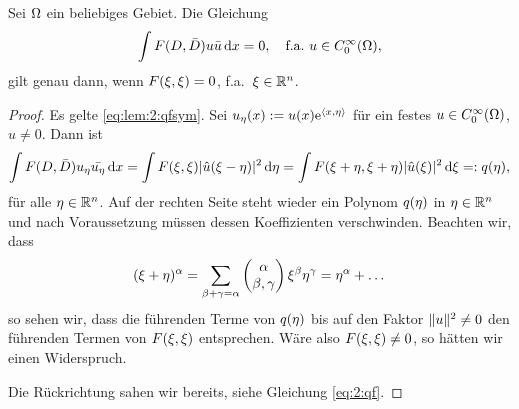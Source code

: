 \begin{lem}\label{lem:2:qfsym}
Sei $\Omega$ ein beliebiges Gebiet.
Die Gleichung
\begin{equation}\label{eq:lem:2:qfsym}
\int F(D,\bar{D})u\bar{u}\,\mathrm d x=0,
\quad\text{f.a.}~u\in C^\infty_0(\Omega),
\end{equation}
gilt genau dann, wenn $F(\xi,\xi)=0$, f.a.~$\xi\in\mathbb R^n$.
\end{lem}
\begin{proof}
Es gelte \eqref{eq:lem:2:qfsym}.
Sei $u_\eta(x):=u(x)\mathrm e^{\langle x,\eta\rangle}$ für ein festes $u\in C^\infty_0(\Omega)$, $u\neq0$.
Dann ist
\begin{equation}
\int F(D,\bar{D})u_\eta\bar{u_\eta}\,\mathrm d x=\int F(\xi,\xi)\lvert\hat{u}(\xi-\eta)\rvert^2\,\mathrm d \eta=\int F(\xi+\eta,\xi+\eta)\lvert\hat{u}(\xi)\rvert^2\,\mathrm d \xi=:q(\eta),
\end{equation}
für alle $\eta\in\mathbb R^n$.
Auf der rechten Seite steht wieder ein Polynom $q(\eta)$ in $\eta\in\mathbb R^n$
und nach Voraussetzung müssen dessen Koeffizienten verschwinden.
Beachten wir, dass
\begin{equation}
(\xi+\eta)^\alpha=\sum_{\beta+\gamma=\alpha}\begin{pmatrix}\alpha\\\beta,\gamma\end{pmatrix}\xi^\beta\eta^\gamma=\eta^\alpha+\dots
\end{equation}
so sehen wir, dass die führenden Terme von $q(\eta)$
bis auf den Faktor $\lVert u\rVert^2\neq0$ den führenden Termen von $F(\xi,\xi)$ entsprechen.
Wäre also $F(\xi,\xi)\neq0$, so hätten wir einen Widerspruch.

Die Rückrichtung sahen wir bereits, siehe Gleichung \eqref{eq:2:qf}.
\end{proof}

